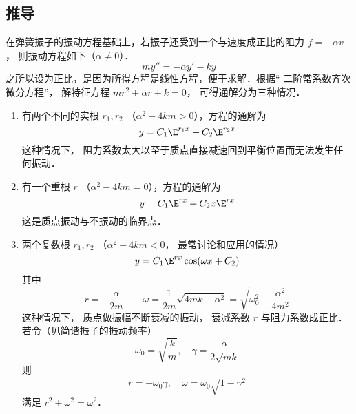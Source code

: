 \subsection{推导}
在弹簧振子的振动方程基础上，若振子还受到一个与速度成正比的阻力 $f =  - \alpha v$， 则振动方程如下（$\alpha \ne 0$）．
\begin{equation}
my'' =  - \alpha y' - ky
\end{equation}
之所以设为正比，是因为所得方程是线性方程，便于求解．根据“ 二阶常系数齐次微分方程”， 解特征方程 $m r^2 + \alpha r + k = 0$， 可得通解分为三种情况．
\begin{enumerate}
\item 有两个不同的实根 $r_1, r_2$ （$\alpha ^2 - 4km > 0$），方程的通解为
\begin{equation}
y = C_1 \E^{r_1 x} + C_2 \E^{r_2 x}
\end{equation}
这种情况下， 阻力系数太大以至于质点直接减速回到平衡位置而无法发生任何振动．

\item 有一个重根 $r$ （$\alpha ^2 - 4km = 0$），方程的通解为
\begin{equation}
y = C_1 \E^{rx} + C_2 x \E^{rx}
\end{equation}
这是质点振动与不振动的临界点．

\item 两个复数根 $r_1,r_2$ （$\alpha ^2 - 4km < 0$， 最常讨论和应用的情况）
\begin{equation}
y = C_1 \E^{rx}\cos(\omega x + C_2)
\end{equation}
其中
\begin{equation}
r =  - \frac{\alpha }{2m}
\qquad
\omega = \frac{1}{2m}\sqrt {4mk - \alpha ^2}  = \sqrt{\omega_0^2 - \frac{\alpha ^2}{4 m^2}}
\end{equation}
这种情况下， 质点做振幅不断衰减的振动， 衰减系数 $r$ 与阻力系数成正比． 若令（见简谐振子的振动频率）
\begin{equation}
\omega_0 = \sqrt{\frac{k}{m}}, \quad \gamma  = \frac{\alpha }{2\sqrt{mk}}
\end{equation}
则 
\begin{equation}
r =  - \omega_0 \gamma,\quad \omega  = \omega_0 \sqrt{1 - \gamma ^2}
\end{equation}
满足
$r^2 + \omega ^2 = \omega_0^2$．
\end{enumerate}



